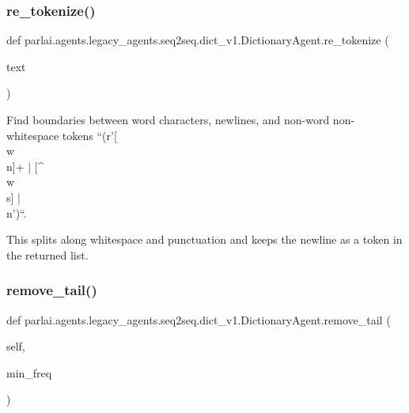 \subsubsection{\texorpdfstring{re\+\_\+tokenize()}{re\_tokenize()}}
{\footnotesize\ttfamily def parlai.\+agents.\+legacy\+\_\+agents.\+seq2seq.\+dict\+\_\+v1.\+Dictionary\+Agent.\+re\+\_\+tokenize (\begin{DoxyParamCaption}\item[{}]{text }\end{DoxyParamCaption})\hspace{0.3cm}{\ttfamily [static]}}

\begin{DoxyVerb}Find boundaries between word characters, newlines, and non-word non-whitespace
tokens ``(r'[\\w\\n]+ | [^\\w\\s] | \\n')``.

This splits along whitespace and punctuation and keeps the newline as a token in
the returned list.
\end{DoxyVerb}
 \mbox{\label{classparlai_1_1agents_1_1legacy__agents_1_1seq2seq_1_1dict__v1_1_1DictionaryAgent_a77b3d40dd63f7ab22bfc947b343339c7}} 
\subsubsection{\texorpdfstring{remove\+\_\+tail()}{remove\_tail()}}
{\footnotesize\ttfamily def parlai.\+agents.\+legacy\+\_\+agents.\+seq2seq.\+dict\+\_\+v1.\+Dictionary\+Agent.\+remove\+\_\+tail (\begin{DoxyParamCaption}\item[{}]{self,  }\item[{}]{min\+\_\+freq }\end{DoxyParamCaption})}

